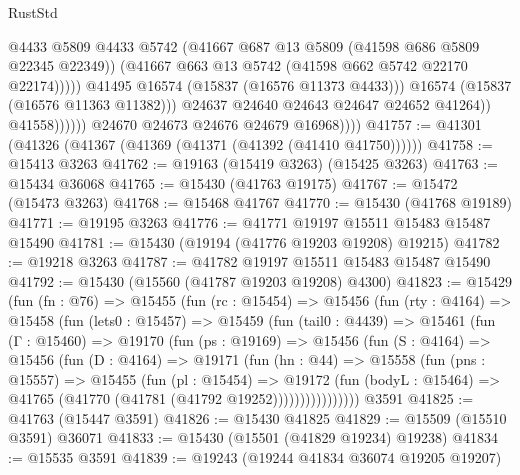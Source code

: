 \begin{lexlean}{RustStd}
\begin{coremodule}
                                      @4433
                                      @5809
                                      @4433
                                      @5742
                                      (@41667 @687 @13 @5809 (@41598 @686 @5809 @22345 @22349))
                                      (@41667 @663 @13 @5742 (@41598 @662 @5742 @22170 @22174)))))
                                @41495
                                @16574
                                (@15837 (@16576 @11373 @4433)))
                              @16574
                              (@15837 (@16576 @11363 @11382)))
                            @24637
                            @24640
                            @24643
                            @24647
                            @24652
                            @41264))
                        @41558))))))
            @24670
            @24673
            @24676
            @24679
            @16968))))
@41757 := @41301 (@41326 (@41367 (@41369 (@41371 (@41392 (@41410 @41750))))))
@41758 := @15413 @3263
@41762 := @19163 (@15419 @3263) (@15425 @3263)
@41763 := @15434 @36068
@41765 := @15430 (@41763 @19175)
@41767 := @15472 (@15473 @3263)
@41768 := @15468 @41767
@41770 := @15430 (@41768 @19189)
@41771 := @19195 @3263
@41776 := @41771 @19197 @15511 @15483 @15487 @15490
@41781 := @15430 (@19194 (@41776 @19203 @19208) @19215)
@41782 := @19218 @3263
@41787 := @41782 @19197 @15511 @15483 @15487 @15490
@41792 := @15430 (@15560 (@41787 @19203 @19208) @4300)
@41823 := @15429
    (fun (fn : @76) =>
    @15455
      (fun (rc : @15454) =>
      @15456
        (fun (rty : @4164) =>
        @15458
          (fun (lets0 : @15457) =>
          @15459
            (fun (tail0 : @4439) =>
            @15461
              (fun (Γ : @15460) =>
              @19170
                (fun (ps : @19169) =>
                @15456
                  (fun (S : @4164) =>
                  @15456
                    (fun (D : @4164) =>
                    @19171
                      (fun (hn : @44) =>
                      @15558
                        (fun (pns : @15557) =>
                        @15455
                          (fun (pl : @15454) =>
                          @19172
                            (fun (bodyL : @15464) =>
                            @41765 (@41770 (@41781 (@41792 @19252))))))))))))))))
    @3591
@41825 := @41763 (@15447 @3591)
@41826 := @15430 @41825
@41829 := @15509 (@15510 @3591) @36071
@41833 := @15430 (@15501 (@41829 @19234) @19238)
@41834 := @15535 @3591
@41839 := @19243 (@19244 @41834 @36074 @19205 @19207)

\end{coremodule}
\end{lexlean}
